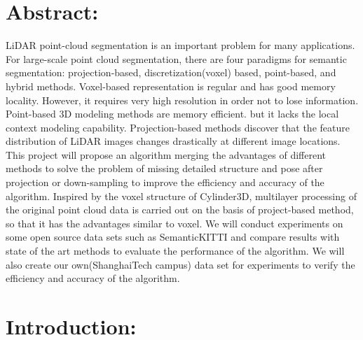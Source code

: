 \documentclass{article}
\begin{document}
    \begin{normalsize}
    
    	\section{Abstract:}
        LiDAR point-cloud segmentation is an important problem for many applications. For large-scale point cloud segmentation, there are four paradigms for semantic segmentation: projection-based, discretization(voxel) based, point-based, and hybrid methods. Voxel-based representation is regular and has good memory locality. However, it requires very high resolution in order not to lose information. Point-based 3D modeling methods are memory efficient. but it lacks the local context modeling capability. Projection-based methods discover that the feature distribution of LiDAR images changes drastically at different image locations. This project will propose an algorithm merging the advantages of different methods to solve the problem of missing detailed structure and pose after projection or down-sampling to improve the efficiency and accuracy of the algorithm. Inspired by the voxel structure of Cylinder3D, multilayer processing of the original point cloud data is carried out on the basis of project-based method, so that it has the advantages similar to voxel. We will conduct experiments on some open source data sets such as SemanticKITTI and compare results with state of the art methods to evaluate the performance of the algorithm. We will also create our own(ShanghaiTech campus) data set for experiments to verify the efficiency and accuracy of the algorithm.    \\
      
		\section{Introduction:}
        

\end{normalsize}
\end{document}
